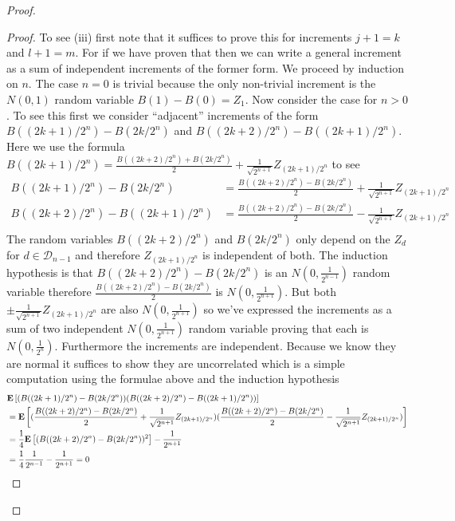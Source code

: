 \begin{proof}
\begin{proof}
To see (iii) first note that it suffices to prove this for increments $j+1=k$ and
$l+1=m$.  For if we have proven that then we can write a general
increment as a sum of independent increments of the former form.  
We proceed by induction on $n$.  The case $n=0$ is trivial
because the only non-trivial increment is the $N(0,1)$ random variable
$B(1) - B(0) = Z_1$.  Now consider the case for $n > 0$.  
To see this first we consider ``adjacent'' increments of the form
$B((2k+1)/2^n) - B(2k/2^n)$ and $B((2k+2)/2^n) - B((2k+1)/2^n)$.  Here
we use the formula $B((2k+1)/2^n) = \frac{B((2k+2)/2^n) +
  B(2k/2^n)}{2} + \frac{1}{\sqrt{2^{n+1}}} Z_{(2k+1)/2^n}$ to see 
\begin{align*}
B((2k+1)/2^n) - B(2k/2^n) &= \frac{B((2k+2)/2^n) -
  B(2k/2^n)}{2} + \frac{1}{\sqrt{2^{n+1}}} Z_{(2k+1)/2^n} \\
B((2k+2)/2^n) - B((2k+1)/2^n) &= \frac{B((2k+2)/2^n) -
  B(2k/2^n)}{2} - \frac{1}{\sqrt{2^{n+1}}} Z_{(2k+1)/2^n} \\
\end{align*}
The random variables $B((2k+2)/2^n)$ and $B(2k/2^n)$ only depend on
the $Z_d$ for $d \in \mathcal{D}_{n-1}$ and therefore $Z_{(2k+1)/2^n}$ is
independent of both.  The induction hypothesis is that $B((2k+2)/2^n) -
  B(2k/2^n)$ is an $N(0, \frac{1}{2^{n-1}})$ random variable therefore $ \frac{B((2k+2)/2^n) -
  B(2k/2^n)}{2}$ is $N(0, \frac{1}{2^{n+1}})$.  But both $\pm
\frac{1}{\sqrt{2^{n+1}}} Z_{(2k+1)/2^n}$ are also $N(0,
\frac{1}{2^{n+1}})$ so we've expressed the increments as a sum of two independent
$N(0, \frac{1}{2^{n+1}})$ random variable proving that each is $N(0,
\frac{1}{2^n})$.  Furthermore the increments are independent.  Because
we know they are normal it suffices to show they are uncorrelated
which is a simple computation using the formulae above and the induction hypothesis
\begin{align*}
&\textbf{E}\left[(B((2k+1)/2^n) - B(2k/2^n))(B((2k+2)/2^n) -
  B((2k+1)/2^n))\right] \\
&= \textbf{E}\left[(\frac{B((2k+2)/2^n) -
  B(2k/2^n)}{2} + \frac{1}{\sqrt{2^{n+1}}} Z_{(2k+1)/2^n} ) (\frac{B((2k+2)/2^n) -
  B(2k/2^n)}{2} - \frac{1}{\sqrt{2^{n+1}}} Z_{(2k+1)/2^n})\right] \\
&=\frac{1}{4}\textbf{E}\left[(B((2k+2)/2^n) -  B(2k/2^n))^2\right] -
\frac{1}{2^{n+1}} \\
&=\frac{1}{4}\frac{1}{2^{n-1}} -  \frac{1}{2^{n+1}}  = 0
\end{align*}


\end{proof}
\end{proof}
